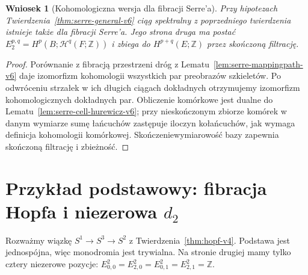 \documentclass[11pt,a4paper,oneside]{report}
\newcommand{\Z}{\mathbb{Z}}
\theoremstyle{plain}
\newtheorem{wniosek}[twierdzenie]{Wniosek}
\theoremstyle{definition}
\theoremstyle{remark}
\begin{document}
\begin{wniosek}[Kohomologiczna wersja dla fibracji Serre'a]
Przy hipotezach Twierdzenia~\ref{thm:serre-general-v6}
ciąg spektralny z poprzedniego twierdzenia istnieje także
dla fibracji Serre'a. Jego strona druga ma postać
$E_2^{p,q}=H^p(B;\mathcal H^q(F;\Z))$ i zbiega
do $H^{p+q}(E;\Z)$ przez skończoną filtrację.
\end{wniosek}
\begin{proof}
Porównanie z fibracją przestrzeni dróg z
Lematu~\ref{lem:serre-mappingpath-v6} daje izomorfizm
kohomologii wszystkich par preobrazów szkieletów.
Po odwróceniu strzałek w ich długich ciągach dokładnych
otrzymujemy izomorfizm kohomologicznych dokładnych par.
Obliczenie komórkowe jest dualne do
Lematu~\ref{lem:serre-cell-hurewicz-v6}; przy nieskończonym
zbiorze komórek w danym wymiarze sumę łańcuchów
zastępuje iloczyn kołańcuchów, jak wymaga definicja
kohomologii komórkowej. Skończeniewymiarowość bazy
zapewnia skończoną filtrację i zbieżność.
\end{proof}

\section{Przykład podstawowy: fibracja Hopfa i niezerowa \texorpdfstring{$d_2$}{d2}}
Rozważmy wiązkę $S^1\to S^3\to S^2$ z
Twierdzenia~\ref{thm:hopf-v4}. Podstawa jest jednospójna,
więc monodromia jest trywialna. Na stronie drugiej
mamy tylko cztery niezerowe pozycje:
$E^2_{0,0}=E^2_{2,0}=E^2_{0,1}=E^2_{2,1}=\Z$.

\begin{center}
\end{center}
\end{document}
